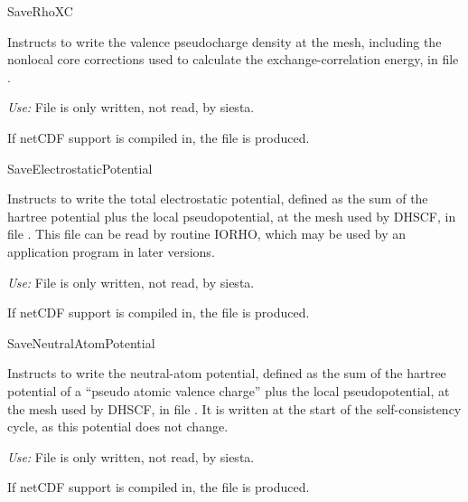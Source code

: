 \begin{fdflogicalF}{SaveRhoXC}
  
  Instructs to write the valence pseudocharge density at the mesh,
  including the nonlocal core corrections used to calculate the
  exchange-correlation energy, in file .

  \textit{Use:} File  is only written, not read, by
  siesta.

  If netCDF support is compiled in, the file  is produced.

\end{fdflogicalF}

\begin{fdflogicalF}{SaveElectrostaticPotential}

  Instructs to write the total electrostatic potential, defined as the
  sum of the hartree potential plus the local pseudopotential, at the
  mesh used by DHSCF, in file . This file can be read by
  routine IORHO, which may be used by an application program in later
  versions.

  \textit{Use:} File  is only written, not read, by
  siesta.

  If netCDF support is compiled in, the file
   is produced.

\end{fdflogicalF}

\begin{fdflogicalF}{SaveNeutralAtomPotential}

  Instructs to write the neutral-atom potential, defined as the sum of
  the hartree potential of a ``pseudo atomic valence charge'' plus the
  local pseudopotential, at the mesh used by DHSCF, in file
  . It is written at the start of the
  self-consistency cycle, as this potential does not change.

  \textit{Use:} File  is only written, not read, by
  siesta.

  If netCDF support is compiled in, the file  is
  produced.

\end{fdflogicalF}

